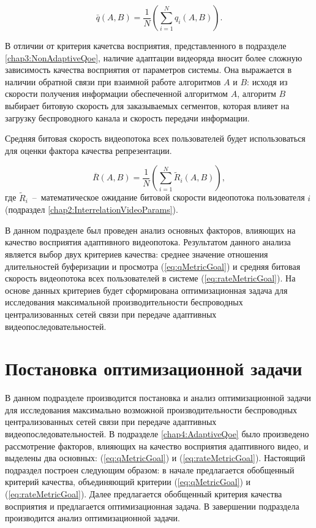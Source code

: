 \begin{equation}
	\label{eq:qMetricGoal}
	\bar{q}\left(A, B\right)=\frac{1}{N}\left(\sum\limits_{i=1}^{N} {q_i\left(A,B\right)}\right).
\end{equation}

В отличии от критерия качетсва восприятия, представленного в подразделе \ref{chap3:NonAdaptiveQoe}, наличие адаптации видеоряда вносит более сложную зависимость качества восприятия от параметров системы. Она выражается в наличии обратной связи при взаимной работе алгоритмов $A$ и $B$: исходя из скорости получения информации обеспеченной алгоритмом $A$, алгоритм $B$ выбирает битовую скорость для заказываемых сегментов, которая влияет на загрузку беспроводного канала и скорость передачи информации.

Средняя битовая скорость видеопотока всех пользователей будет использоваться для оценки фактора качества репрезентации.

\begin{equation}
	\label{eq:rateMetricGoal}
	\overline{R}\left(A,B\right) = \frac{1}{N}\left(\sum\limits_{i=1}^{N} {\tilde{R}_i\left(A,B\right)}\right),
\end{equation}
где $\tilde{R}_i$~--~математическое ожидание битовой скорости видеопотока пользователя $i$ (подраздел \ref{chap2:InterrelationVideoParams}).

В данном подразделе был проведен анализ основных факторов, влияющих на качество восприятия адаптивного видеопотока. Результатом данного анализа является выбор двух критериев качества: среднее значение отношения длительностей буферизации и просмотра (\ref{eq:qMetricGoal}) и средняя битовая скорость видеопотока всех пользователей в системе (\ref{eq:rateMetricGoal}). На основе данных критериев будет сформирована оптимизационная задача для исследования максимальной производительности беспроводных централизованных сетей связи при передаче адаптивных видеопоследовательностей.

\section{Постановка оптимизационной задачи}
\label{chap4:AdaptiveOptimizationProblem}

В данном подразделе производится постановка и анализ оптимизационной задачи для исследования максимально возможной производительности беспроводных централизованных сетей связи при передаче адаптивных видеопоследовательностей. В подразделе \ref{chap4:AdaptiveQoe} было произведено рассмотрение факторов, влияющих на качество восприятия адаптивного видео, и выделены два основных: (\ref{eq:qMetricGoal}) и (\ref{eq:rateMetricGoal}). Настоящий подраздел построен следующим образом: в начале предлагается обобщенный критерий качества, объединяющий критерии (\ref{eq:qMetricGoal}) и (\ref{eq:rateMetricGoal}). Далее предлагается обобщенный критерия качества восприятия и предлагается оптимизационная задача. В завершении подраздела производится анализ оптимизационной задачи.


